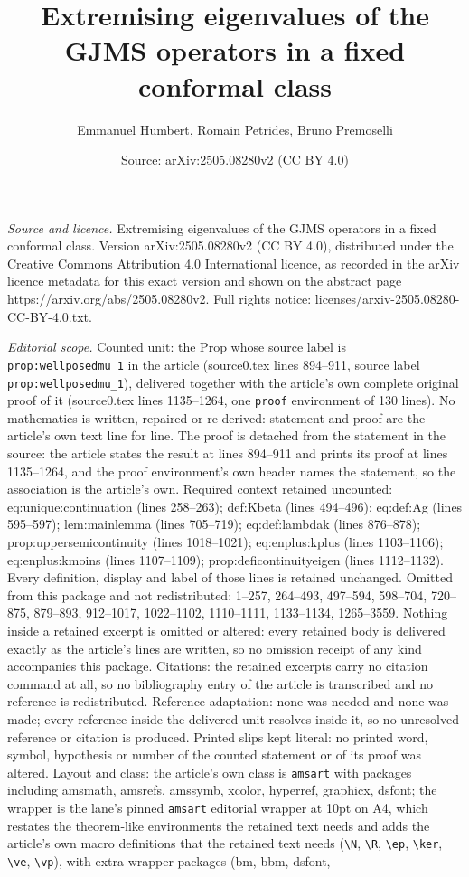 \documentclass[10pt,a4paper]{amsart}
\title[Extremising eigenvalues of the GJMS operators in a fixed con]{Extremising eigenvalues of the GJMS operators in a fixed conformal class}
\author{Emmanuel Humbert, Romain Petrides, Bruno Premoselli}
\date{Source: arXiv:2505.08280v2 (CC BY 4.0)}
\begin{document}
\maketitle

\noindent\emph{Source and licence.} Extremising eigenvalues of the GJMS operators in a fixed conformal class. Version arXiv:2505.08280v2 (CC BY 4.0), distributed under the Creative Commons Attribution 4.0 International licence, as recorded in the arXiv licence metadata for this exact version and shown on the abstract page https://arxiv.org/abs/2505.08280v2. Full rights notice: licenses/arxiv-2505.08280-CC-BY-4.0.txt.\par\smallskip

\noindent\textit{Editorial scope.} Counted unit: the Prop whose source label is \texttt{prop:wellposedmu\_1} in the article (source0.tex lines 894--911, source label \texttt{prop:wellposedmu\_1}), delivered together with the article's own complete original proof of it (source0.tex lines 1135--1264, one \texttt{proof} environment of 130 lines). No mathematics is written, repaired or re-derived: statement and proof are the article's own text line for line. The proof is detached from the statement in the source: the article states the result at lines 894--911 and prints its proof at lines 1135--1264, and the proof environment's own header names the statement, so the association is the article's own. Required context retained uncounted: eq:unique:continuation (lines 258--263); def:Kbeta (lines 494--496); eq:def:Ag (lines 595--597); lem:mainlemma (lines 705--719); eq:def:lambdak (lines 876--878); prop:uppersemicontinuity (lines 1018--1021); eq:enplus:kplus (lines 1103--1106); eq:enplus:kmoins (lines 1107--1109); prop:deficontinuityeigen (lines 1112--1132). Every definition, display and label of those lines is retained unchanged. Omitted from this package and not redistributed: 1--257, 264--493, 497--594, 598--704, 720--875, 879--893, 912--1017, 1022--1102, 1110--1111, 1133--1134, 1265--3559. Nothing inside a retained excerpt is omitted or altered: every retained body is delivered exactly as the article's lines are written, so no omission receipt of any kind accompanies this package. Citations: the retained excerpts carry no citation command at all, so no bibliography entry of the article is transcribed and no reference is redistributed. Reference adaptation: none was needed and none was made; every reference inside the delivered unit resolves inside it, so no unresolved reference or citation is produced. Printed slips kept literal: no printed word, symbol, hypothesis or number of the counted statement or of its proof was altered. Layout and class: the article's own class is \texttt{amsart} with packages including amsmath, amsrefs, amssymb, xcolor, hyperref, graphicx, dsfont; the wrapper is the lane's pinned \texttt{amsart} editorial wrapper at 10pt on A4, which restates the theorem-like environments the retained text needs and adds the article's own macro definitions that the retained text needs (\texttt{\textbackslash N}, \texttt{\textbackslash R}, \texttt{\textbackslash ep}, \texttt{\textbackslash ker}, \texttt{\textbackslash ve}, \texttt{\textbackslash vp}), with extra wrapper packages (bm, bbm, dsfont, 
\end{document}
